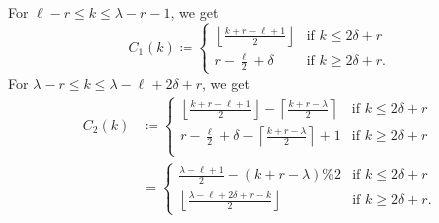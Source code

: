 \begin{itemize}
  \ii For $\ell - r \le k \le \lambda - r - 1$, we get
  \[ C_1(k) \coloneqq \begin{cases}
    \left\lfloor \frac{k + r - \ell + 1}{2} \right\rfloor &\text{if } k \le 2 \delta + r \\
    r - \frac{\ell}{2} + \delta &\text{if } k \ge 2 \delta + r.
    \end{cases} \]
  \ii For $\lambda - r \le k \le \lambda - \ell + 2 \delta + r$, we get
  \begin{align*}
    C_2(k)
    &\coloneqq \begin{cases}
      \left\lfloor \frac{k+r-\ell+1}{2} \right\rfloor - \left\lceil \frac{k+r-\lambda}{2} \right\rceil &\text{if } k \le 2 \delta + r \\
      r - \frac{\ell}{2} + \delta - \left\lceil \frac{k+r-\lambda}{2} \right\rceil + 1 &\text{if } k \ge 2 \delta + r \\
    \end{cases} \\
    &= \begin{cases}
      \frac{\lambda-\ell+1}{2} - (k+r-\lambda)\%2 &\text{if } k \le 2 \delta + r \\
      \left\lfloor \frac{\lambda - \ell + 2\delta + r - k}{2} \right\rfloor &\text{if } k \ge 2 \delta + r.
    \end{cases}
  \end{align*}


\end{itemize}
